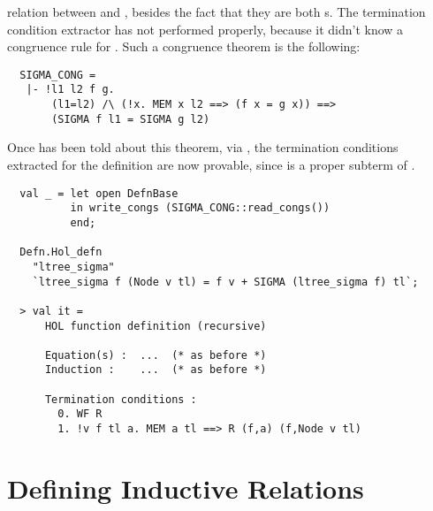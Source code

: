 relation between  and , besides the fact 
that they are both s. The termination condition extractor 
has not performed properly, because it didn't know a congruence rule 
for . Such a congruence theorem is the following:
%
\begin{hol}
\begin{verbatim}
  SIGMA_CONG =
   |- !l1 l2 f g.
       (l1=l2) /\ (!x. MEM x l2 ==> (f x = g x)) ==>
       (SIGMA f l1 = SIGMA g l2)
\end{verbatim}
\end{hol}
%
Once  has been told about this theorem, via 
, the termination conditions extracted for 
the definition are now provable, since  is a 
proper subterm of .
%
\begin{session}
\begin{hol}
\begin{verbatim}
  val _ = let open DefnBase
          in write_congs (SIGMA_CONG::read_congs())
          end;
 
  Defn.Hol_defn
    "ltree_sigma"
    `ltree_sigma f (Node v tl) = f v + SIGMA (ltree_sigma f) tl`;
 
  > val it =
      HOL function definition (recursive)
 
      Equation(s) :  ...  (* as before *)
      Induction :    ...  (* as before *)
 
      Termination conditions :
        0. WF R
        1. !v f tl a. MEM a tl ==> R (f,a) (f,Node v tl)
\end{verbatim}
\end{hol}
\end{session}

\section{Defining Inductive Relations}

